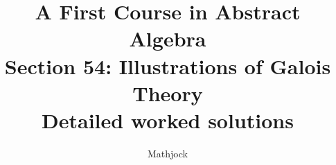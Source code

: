 
\title{\textbf{A First Course in Abstract Algebra}\\[0.3em]Section 54: Illustrations of Galois Theory\\[0.3em]\large Detailed worked solutions}
\author{Mathjock}
\date{}

\maketitle
\bookinfo
\tableofcontents
\clearpage
\renewcommand{\thesection}{54}
\renewcommand{\theHsection}{fraleigh.54}


